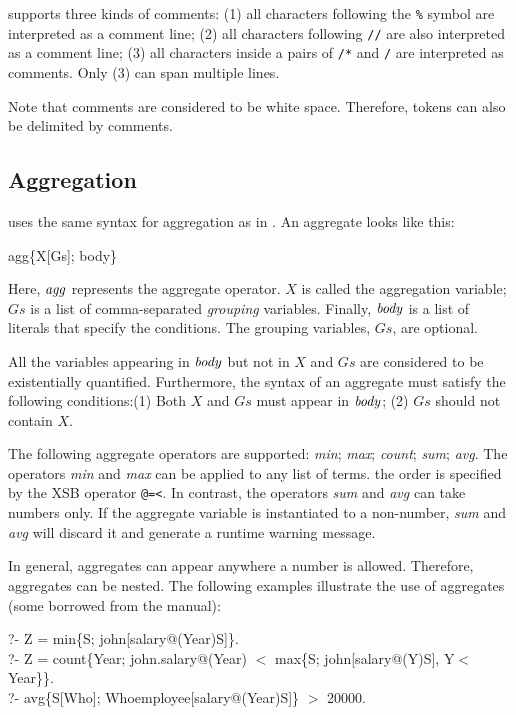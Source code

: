\documentclass[11pt]{report}
\begin{document}
\FLORA supports three kinds of comments: (1) all characters following the
{\tt \%} symbol are interpreted as a comment line; (2) all characters
following {\tt //} are also interpreted as a comment line;
(3) all characters inside a pairs of {\tt /*} and {\tt */} are
interpreted as comments. Only (3) can span multiple lines.

Note that comments are considered to be white space. Therefore, tokens can
also be delimited by comments.


\subsection{Aggregation}

\FLORA uses the same syntax for aggregation as in \FLORID. An aggregate
looks like this:
\begin{qrules}
agg\{X[Gs]; body\}
\end{qrules}
Here, ${\it agg}$ represents the aggregate operator. $X$ is called the
aggregation variable; $Gs$ is a list of comma-separated \emph{grouping}
variables. Finally, ${\it body}$ is a list of literals that specify the
conditions. The grouping variables, $Gs$, are optional.

All the variables appearing in ${\it body}$ but not in $X$ and $Gs$ are
considered to be existentially \mbox{quantified}. Furthermore, the syntax of an
aggregate must satisfy the following conditions:\linebreak (1) Both $X$ and $Gs$ must
appear in ${\it body}$; (2) $Gs$ should not contain $X$.

The following aggregate operators are supported: {\it min}; {\it max}; {\it
  count}; {\it sum}; {\it avg}. The operators {\it min} and {\it max} can
be applied to any list of terms. the order is specified by the XSB operator
{\tt @=<}.  In contrast, the operators {\it sum} and {\it avg} can take
numbers only. If the aggregate variable is instantiated to a non-number,
{\it sum} and {\it avg} will discard it and generate a runtime warning
message.

In general, aggregates can appear anywhere a number is allowed. Therefore,
aggregates can be nested. The following examples illustrate the use of
aggregates (some borrowed from the \FLORID manual):
\begin{qrules}
?- Z = min\{S; john[salary@(Year){\fd}S]\}. \\
?- Z = count\{Year; john.salary@(Year) $<$ max\{S; john[salary@(Y){\fd}S], Y$<$Year\}\}. \\
?- avg\{S[Who]; Who{\isa}employee[salary@(Year){\fd}S]\} $>$ 20000.
\end{qrules}
\end{document}
